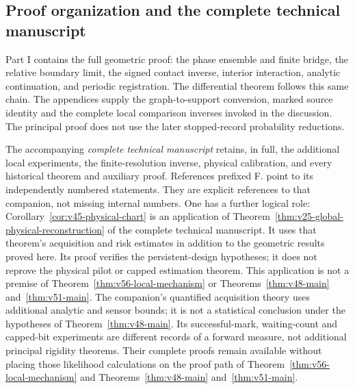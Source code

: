 \subsection{Proof organization and the complete technical manuscript}

Part I contains the full geometric proof: the phase ensemble and finite
bridge, the relative boundary limit, the signed contact inverse,
interior interaction, analytic continuation, and periodic registration.
The differential theorem follows this same chain.  The appendices supply
the graph-to-support conversion, marked source identity and the complete
local comparison inverses invoked in the discussion.  The principal
proof does not use the later stopped-record probability reductions.

The accompanying \emph{complete technical manuscript} retains, in full,
the additional local experiments, the finite-resolution inverse, physical
calibration, and every historical theorem and auxiliary proof.  References
prefixed \textup{F.} point to its independently numbered statements.
They are explicit references to that companion, not missing internal
numbers.  One has a further logical role:
Corollary~\ref{cor:v45-physical-chart} is an application of
Theorem~\ref{thm:v25-global-physical-reconstruction} of the complete
technical manuscript.  It uses that theorem's acquisition and risk
estimates in addition to the geometric results proved here.  Its proof
verifies the persistent-design hypotheses; it does not reprove the
physical pilot or capped estimation theorem.  This application is not
a premise of Theorem~\ref{thm:v56-local-mechanism} or
Theorems~\ref{thm:v48-main} and~\ref{thm:v51-main}.
The companion's quantified acquisition theory uses additional
analytic and sensor bounds; it is not a statistical conclusion under the
hypotheses of Theorem~\ref{thm:v48-main}.  Its successful-mark, waiting-count
and capped-bit experiments are different records of a forward measure,
not additional principal rigidity theorems.  Their complete proofs remain
available without placing those likelihood calculations on the proof
path of Theorem~\ref{thm:v56-local-mechanism} and Theorems~\ref{thm:v48-main} and~\ref{thm:v51-main}.
